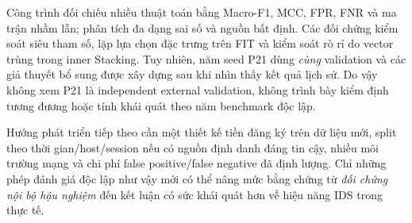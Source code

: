 Công trình đối chiếu nhiều thuật toán bằng Macro-F1, MCC, FPR, FNR và ma trận nhầm lẫn; phân tích đa dạng sai số và nguồn bất định. Các đối chứng kiểm soát siêu tham số, lặp lựa chọn đặc trưng trên FIT và kiểm soát rò rỉ do vector trùng trong inner Stacking. Tuy nhiên, năm seed P21 dùng \emph{cùng} validation và các giả thuyết bổ sung được xây dựng sau khi nhìn thấy kết quả lịch sử. Do vậy không xem P21 là independent external validation, không trình bày kiểm định tương đương hoặc tính khái quát theo năm benchmark độc lập.

Hướng phát triển tiếp theo cần một thiết kế tiền đăng ký trên dữ liệu mới, split theo thời gian/host/session nếu có nguồn định danh đáng tin cậy, nhiều môi trường mạng và chi phí false positive/false negative đã định lượng. Chỉ những phép đánh giá độc lập như vậy mới có thể nâng mức bằng chứng từ \emph{đối chứng nội bộ hậu nghiệm} đến kết luận có sức khái quát hơn về hiệu năng IDS trong thực tế.
